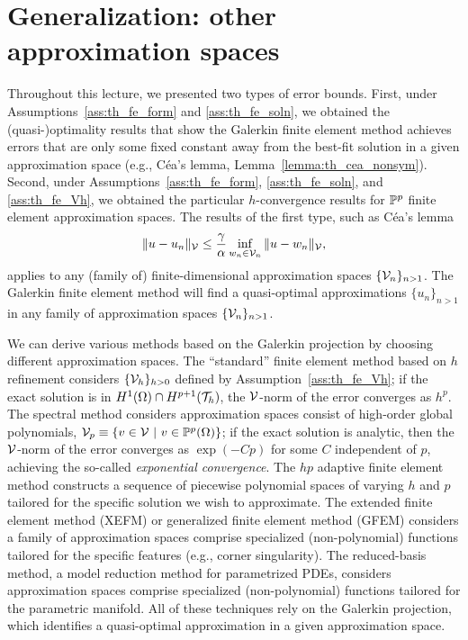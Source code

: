 \section{Generalization: other approximation spaces}
Throughout this lecture, we presented two types of error bounds. First, under Assumptions~\ref{ass:th_fe_form} and \ref{ass:th_fe_soln}, we obtained the (quasi-)optimality results that show the Galerkin finite element method achieves errors that are only some fixed constant away from the best-fit solution in a given approximation space (e.g., C\'ea's lemma, Lemma~\ref{lemma:th_cea_nonsym}).  Second, under Assumptions~\ref{ass:th_fe_form}, \ref{ass:th_fe_soln}, and \ref{ass:th_fe_Vh}, we obtained the particular $h$-convergence results for $\mathbb{P}^p$ finite element approximation spaces. The results of the first type, such as C\'ea's lemma
\begin{equation*}
  \| u - u_n \|_{\mathcal{V}} \leq \frac{\gamma}{\alpha} \inf_{w_n \in \mathcal{V}_n} \| u - w_n \|_{\mathcal{V}},
\end{equation*}
applies to any (family of) finite-dimensional approximation spaces $\{ \mathcal{V}_n \}_{n > 1}$.  The Galerkin finite element method will find a quasi-optimal approximations $\{u_n\}_{n > 1}$ in any family of approximation spaces $\{\mathcal{V}_n \}_{n > 1}$. %

We can derive various methods based on the Galerkin projection by choosing different approximation spaces. The ``standard'' finite element method based on $h$ refinement considers $\{ \mathcal{V}_h \}_{h > 0}$ defined by Assumption~\ref{ass:th_fe_Vh}; if the exact solution is in $H^1(\Omega) \cap H^{p+1}(\mathcal{T}_h)$, the $\mathcal{V}$-norm of the error converges as $h^p$. The spectral method considers approximation spaces consist of high-order global polynomials, $\mathcal{V}_p \equiv \{ v \in \mathcal{V} \ | \ v \in \mathbb{P}^p(\Omega) \}$; if the exact solution is analytic, then the $\mathcal{V}$-norm of the error converges as $\exp(-Cp)$ for some $C$ independent of $p$, achieving the so-called \emph{exponential convergence}. The $hp$ adaptive finite element method constructs a sequence of piecewise polynomial spaces of varying $h$ and $p$ tailored for the specific solution we wish to approximate. The extended finite element method (XEFM) or generalized finite element method (GFEM) considers a family of approximation spaces comprise specialized (non-polynomial) functions tailored for the specific features (e.g., corner singularity).  The reduced-basis method, a model reduction method for parametrized PDEs, considers approximation spaces comprise specialized (non-polynomial) functions tailored for the parametric manifold.  All of these techniques rely on the Galerkin projection, which identifies a quasi-optimal approximation in a given approximation space.

